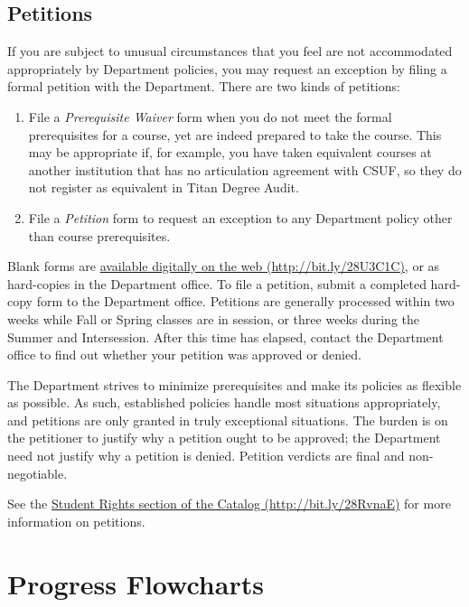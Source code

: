 \documentclass{book}
\newcommand{\CampusName}{CSUF}
\begin{document}
\section{Petitions}
\label{section:petitions}

If you are subject to unusual circumstances that you feel are not accommodated appropriately by Department policies, you may request an exception by filing a formal petition with the Department. There are two kinds of petitions:
\begin{enumerate}
\item File a \emph{Prerequisite Waiver} form when you do not meet the formal prerequisites for a course, yet are indeed prepared to take the course. This may be appropriate if, for example, you have taken equivalent courses at another institution that has no articulation agreement with \CampusName, so they do not register as equivalent in Titan Degree Audit.
\item File a \emph{Petition} form to request an exception to any Department policy other than course prerequisites.
\end{enumerate}

Blank forms are \href{http://fullerton.edu/ecs/cs/resources/formsDocuments.asp}{available digitally on the web (\url{http://bit.ly/28U3C1C})}, or as hard-copies in the Department office. To file a petition, submit a completed hard-copy form to the Department office. Petitions are generally processed within two weeks while Fall or Spring classes are in session, or three weeks during the Summer and Intersession. After this time has elapsed, contact the Department office to find out whether your petition was approved or denied.

The Department strives to minimize prerequisites and make its policies as flexible as possible. As such, established policies handle most situations appropriately, and petitions are only granted in truly exceptional situations. The burden is on the petitioner to justify why a petition ought to be approved; the Department need not justify why a petition is denied. Petition verdicts are final and non-negotiable.

See the \href{http://catalog.fullerton.edu/content.php?catoid=2&navoid=115#Student_Rights}{Student Rights section of the Catalog (\url{http://bit.ly/28RvnaE})} for more information on petitions.

\chapter{Progress Flowcharts}
\end{document}
